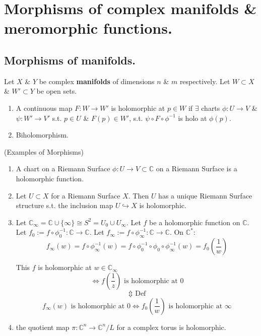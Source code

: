 \documentclass{article}
\begin{document}
\section{Morphisms of complex \textbf{manifolds} \& meromorphic functions.}

\subsection{Morphisms of \textbf{manifolds}.}

\begin{definition}
    Let $X$ \& $Y$ be complex \textbf{manifolds} of dimensions $n$ \& $m$ respectively.
    Let $W \subset X$ \& $W' \subset Y$ be open sets.
    \begin{enumerate}
        \item A continuous map $F: W \to W'$ is holomorphic at $p \in W$
        if $\exists$ charts $\phi : U \to V$ \& $\psi : W' \to V'$ s.t. $p \in U$
        \& $F(p) \in W'$, s.t. $\psi \circ F \circ \phi^{-1}$ is holo at $\phi(p)$.
        \item Biholomorphism.
    \end{enumerate}
\end{definition}

\begin{example}(Examples of Morphisms)
\begin{enumerate}
    \item A chart on a Riemann Surface $\phi : U \to V \subset \mathbb{C}$ on a Riemann Surface is a holomorphic function.
    \item Let $U \subset X$ for a Riemann Surface $X$. Then $U$ has a unique Riemann Surface structure s.t. the inclusion map $U \hookrightarrow X$ is holomorphic.
    \item Let $\mathbb{C}_{\infty} = \mathbb{C} \cup \{\infty\} \cong S^2 = U_0 \cup U_{\infty}$.
    Let $f$ be a holomorphic function on $\mathbb{C}$.
    Let $f_0 := f \circ \phi_0^{-1} : \mathbb{C} \to \mathbb{C}$.
    Let $f_{\infty} := f \circ \phi_{\infty}^{-1} : \mathbb{C} \to \mathbb{C}$.
On $\mathbb{C}^*$:
$$
f_{\infty}(w) = f \circ \phi_{\infty}^{-1}(w) = f \circ \phi_0^{-1} \circ \phi_0 \circ \phi_{\infty}^{-1}(w) = f_0 \left(\frac{1}{w}\right)
$$

This $f$ is holomorphic at $w \in \mathbb{C}_{\infty}$
$$
\iff f\left(\frac{1}{z}\right) \text{ is holomorphic at } 0
$$
$$
\Updownarrow \text{ Def}
$$
$$
f_{\infty}(w) \text{ is holomorphic at } 0 \iff f_0 \left(\frac{1}{w}\right) \text{ is holomorphic at } \infty
$$
 \item the quotient map $\pi: \mathbb{C}^n \to \mathbb{C}^n/L$ for a complex torus is holomorphic.
\end{enumerate}
\end{example}
\end{document}

